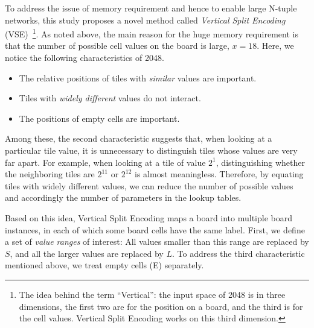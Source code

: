 To address the issue of memory requirement and hence to enable large N-tuple networks, this study proposes a novel method called \emph{Vertical Split Encoding} (VSE)~\footnote{The idea behind the term ``Vertical'': the input space of 2048 is in three dimensions, the first two are for the position on a board, and the third is for the cell values. Vertical Split Encoding works on this third dimension.}.
As noted above, the main reason for the huge memory requirement is that the number of possible cell values on the board is large, $x = 18$.
Here, we notice the following characteristics of 2048.
\begin{itemize}
 \item The relative positions of tiles with \emph{similar} values are important.
 \item Tiles with \emph{widely different} values do not interact.
 \item The positions of empty cells are important.
\end{itemize}
Among these, the second characteristic suggests that, when looking at a particular tile value, it is unnecessary to distinguish tiles whose values are very far apart. For example, when looking at a tile of value $2^1$, distinguishing whether the neighboring tiles are $2^{11}$ or $2^{12}$ is almost meaningless.
Therefore, by equating tiles with widely different values, we can reduce the number of possible values and accordingly the number of parameters in the lookup tables.

Based on this idea, Vertical Split Encoding maps a board into multiple board instances, in each of which some board cells have the same label.
First, we define a set of \emph{value ranges} of interest: All values smaller than this range are replaced by $S$, and all the larger values are replaced by $L$.
To address the third characteristic mentioned above, we treat empty cells (E) separately.

